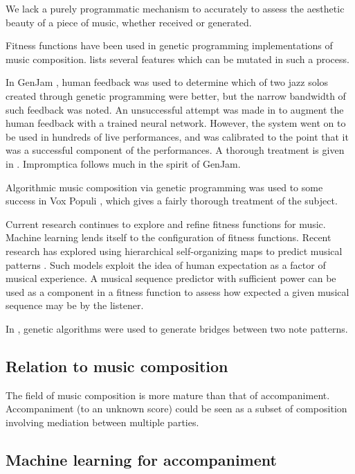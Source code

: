 \documentclass[11pt,conference,letterpaper]{IEEEtran}
\begin{document}
We lack a purely programmatic mechanism to accurately to assess the aesthetic beauty of a piece of music, whether received or generated.

Fitness functions have been used in genetic programming implementations of music composition. \cite{towsey2001towards} lists several features which can be mutated in such a process.

In GenJam \cite{biles1994genjam}, human feedback was used to determine which of two jazz solos created through genetic programming were better, but the narrow bandwidth of such feedback was noted. An unsuccessful attempt was made in  \cite{biles1996neural} to augment the human feedback with a trained neural network. However, the system went on to be used in hundreds of live performances, and was calibrated to the point that it was a successful component of the performances. A thorough treatment is given in \cite{biles2007improvizing}. Impromptica follows much in the spirit of GenJam.

Algorithmic music composition via genetic programming was used to some success in Vox Populi \cite{moroni2000vox}, which gives a fairly thorough treatment of the subject.

Current research continues to explore and refine fitness functions for music. Machine learning lends itself to the configuration of fitness functions. Recent research has explored using hierarchical self-organizing maps to predict musical patterns \cite{law2008towards}. Such models exploit the idea of human expectation as a factor of musical experience. A musical sequence predictor with sufficient power can be used as a component in a fitness function to assess how expected a given musical sequence may be by the listener.


In \cite{horner1991genetic}, genetic algorithms were used to generate bridges between two note patterns.

\subsection{Relation to music composition}

The field of music composition is more mature than that of accompaniment. Accompaniment (to an unknown score) could be seen as a subset of composition involving mediation between multiple parties.

\subsection{Machine learning for accompaniment}
\end{document}
